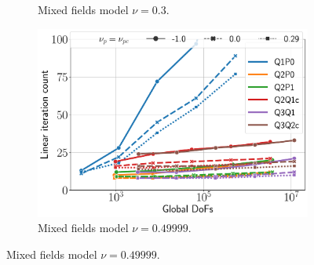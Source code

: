 \documentclass{beamer}
\begin{document}
\begin{frame}
\begin{figure}[H]
\begin{subfigure}{.5\textwidth}
			\caption{Mixed fields model $\nu = 0.3$.}
		\end{subfigure}%
		\begin{subfigure}{.5\textwidth}
			\centering
			\includegraphics[width=.8\textwidth]{../figs/KSPiter-punch2-mixed-0.49999.pdf}
			\caption{Mixed fields model $\nu = 0.49999$.}
		\end{subfigure}
	\end{figure}
\end{frame}
\end{document}
